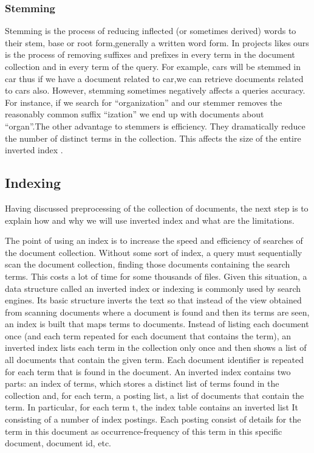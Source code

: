 \documentclass{article}
\begin{document}
\subsubsection{Stemming}

Stemming is the process of reducing inflected (or sometimes derived) words to their stem, base or root form,generally a written word form. In projects likes ours is the process of removing suffixes and prefixes in every term in the document collection and in every term of the query. For example, cars will be stemmed in car thus if we have a document related to car,we can retrieve documents related to cars also. However, stemming sometimes negatively affects a queries accuracy. For instance, if we search for “organization” and our stemmer removes the reasonably common suffix “ization” we end up with documents about “organ”.The other advantage to stemmers is efficiency. They dramatically reduce the number of distinct terms in the collection. This affects the size of the entire inverted index \cite{WikiStemming}.

\subsection{Indexing}

Having discussed preprocessing of the collection of documents, the next step is to explain how and why we will use inverted index and what are the limitations.

The point of using an index is to increase the speed and efficiency of searches of the document collection. Without some sort of index, a query must sequentially scan the document collection, finding those documents containing the search terms. This costs a lot of time for some thousands of files. Given this situation, a data structure called an inverted index or indexing is commonly used by search engines. Its basic structure inverts the text so that instead of the view obtained from scanning documents where a document is found and then its terms are seen, an index is built that maps terms to documents. Instead of listing each document once (and each term repeated for each document that contains the term), an inverted index lists each term in the collection only once and then shows a list of all documents that contain the given term. Each document identifier is repeated for each term that is found in the document. An inverted index contains two parts: an index of terms, which stores a distinct list of terms found in the collection and, for each term, a posting list, a list of documents that contain the term. In particular, for each term t, the index table contains an inverted list It consisting of a number of index postings. Each posting consist of details for the term in this document as occurrence-frequency of this term in this specific document, document id, etc.
\end{document}
